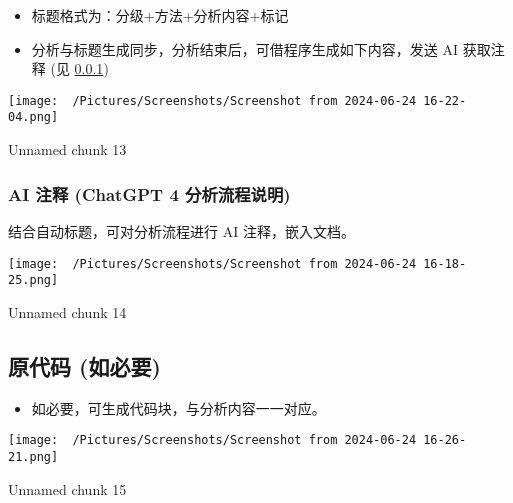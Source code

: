\documentclass[
]{article}
\providecommand{\tightlist}{%
  \setlength{\itemsep}{0pt}\setlength{\parskip}{0pt}}
\begin{document}
\begin{itemize}
\tightlist
\item
  标题格式为：分级+方法+分析内容+标记
\item
  分析与标题生成同步，分析结束后，可借程序生成如下内容，发送 AI 获取注释 (见 \ref{ai})
\end{itemize}

\def\@captype{figure}
\begin{center}
\texttt{[image: ~/Pictures/Screenshots/Screenshot from 2024-06-24 16-22-04.png]}
\caption{Unnamed chunk 13}\label{fig:unnamed-chunk-13}
\end{center}

\hypertarget{ai}{%
\subsubsection{AI 注释 (ChatGPT 4 分析流程说明)}\label{ai}}

结合自动标题，可对分析流程进行 AI 注释，嵌入文档。

\def\@captype{figure}
\begin{center}
\texttt{[image: ~/Pictures/Screenshots/Screenshot from 2024-06-24 16-18-25.png]}
\caption{Unnamed chunk 14}\label{fig:unnamed-chunk-14}
\end{center}

\hypertarget{ux539fux4ee3ux7801-ux5982ux5fc5ux8981}{%
\subsection{原代码 (如必要)}\label{ux539fux4ee3ux7801-ux5982ux5fc5ux8981}}

\begin{itemize}
\tightlist
\item
  如必要，可生成代码块，与分析内容一一对应。
\end{itemize}

\def\@captype{figure}
\begin{center}
\texttt{[image: ~/Pictures/Screenshots/Screenshot from 2024-06-24 16-26-21.png]}
\caption{Unnamed chunk 15}\label{fig:unnamed-chunk-15}
\end{center}
\end{document}
